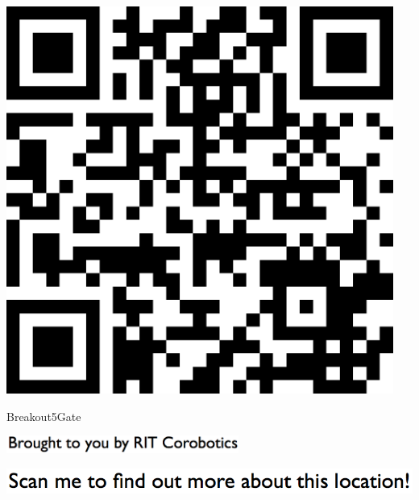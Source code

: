 \documentclass[letterpaper]{article}
\begin{document}
 \begingroup 
 \centerline{\includegraphics[scale=1,width=5in,height=5in]{Breakout5Gate.png}} 
 \endgroup 
 \vspace*{\fill} 

 \hfill{\small Breakout5Gate} 

  \vspace{0.7in} 
 
 \centerline{\includegraphics[scale=1,width=3in]{text-bottom.png}} 
 
 \pagebreak 
{} 
 \vspace*{\fill} 
 
  \centerline{\includegraphics[scale=1,width=6in]{text-top.png}} 
 
 \vspace{0.5in} 
 
\end{document}
